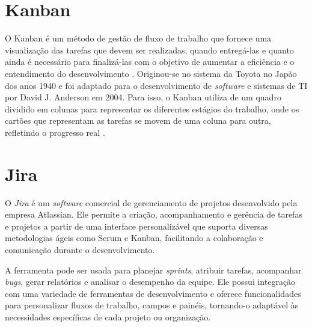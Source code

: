 \section{Kanban}

O Kanban é um método de gestão de fluxo de trabalho que fornece uma visualização das tarefas que devem ser realizadas, quando entregá-las e quanto ainda é necessário para finalizá-las com o objetivo de aumentar a eficiência e o entendimento do desenvolvimento \cite{ohno1988toyota}. Originou-se no sistema da Toyota no Japão dos anos 1940 e foi adaptado para o desenvolvimento de \textit{software} e sistemas de TI por David J. Anderson em 2004. Para isso, o Kanban utiliza de um quadro dividido em colunas para representar os diferentes estágios do trabalho, onde os cartões que representam as tarefas se movem de uma coluna para outra, refletindo o progresso real \cite{zayat2020framework}.

\section{Jira}

O \textit{Jira} é um \textit{software} comercial de gerenciamento de projetos desenvolvido pela empresa Atlassian. Ele permite a criação, acompanhamento e gerência de tarefas e projetos a partir de uma interface personalizável que suporta diversas metodologias ágeis como Scrum e Kanban, facilitando a colaboração e comunicação durante o desenvolvimento.

A ferramenta pode ser usada para planejar \textit{sprints}, atribuir tarefas, acompanhar \textit{bugs}, gerar relatórios e analisar o desempenho da equipe. Ele possui integração com uma variedade de ferramentas de desenvolvimento e oferece funcionalidades para personalizar fluxos de trabalho, campos e painéis, tornando-o adaptável às necessidades específicas de cada projeto ou organização.
